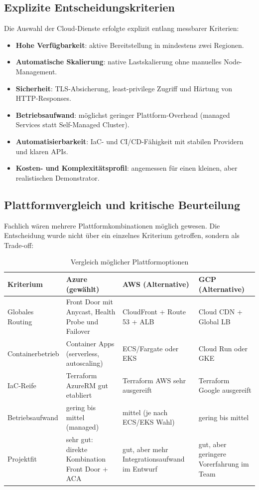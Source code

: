 \documentclass[a4paper,11pt]{article}
\begin{document}
\subsection{Explizite Entscheidungskriterien}
Die Auswahl der Cloud-Dienste erfolgte explizit entlang messbarer Kriterien:

\begin{itemize}
  \item \textbf{Hohe Verfügbarkeit}: aktive Bereitstellung in mindestens zwei Regionen.
  \item \textbf{Automatische Skalierung}: native Lastskalierung ohne manuelles Node-Management.
  \item \textbf{Sicherheit}: TLS-Absicherung, least-privilege Zugriff und Härtung von HTTP-Responses.
  \item \textbf{Betriebsaufwand}: möglichst geringer Plattform-Overhead (managed Services statt Self-Managed Cluster).
  \item \textbf{Automatisierbarkeit}: IaC- und CI/CD-Fähigkeit mit stabilen Providern und klaren APIs.
  \item \textbf{Kosten- und Komplexitätsprofil}: angemessen für einen kleinen, aber realistischen Demonstrator.
\end{itemize}

\subsection{Plattformvergleich und kritische Beurteilung}
Fachlich wären mehrere Plattformkombinationen möglich gewesen. Die Entscheidung wurde nicht über ein einzelnes Kriterium getroffen, sondern als Trade-off:

\begin{table}[H]
\centering
\caption{Vergleich möglicher Plattformoptionen}
\begin{tabular}{p{}p{}p{}p{}}
\toprule
\textbf{Kriterium} & \textbf{Azure (gewählt)} & \textbf{AWS (Alternative)} & \textbf{GCP (Alternative)} \\
\midrule
Globales Routing & Front Door mit Anycast, Health Probe und Failover & CloudFront + Route 53 + ALB & Cloud CDN + Global LB \\
Containerbetrieb & Container Apps (serverless, autoscaling) & ECS/Fargate oder EKS & Cloud Run oder GKE \\
IaC-Reife & Terraform AzureRM gut etabliert & Terraform AWS sehr ausgereift & Terraform Google ausgereift \\
Betriebsaufwand & gering bis mittel (managed) & mittel (je nach ECS/EKS Wahl) & gering bis mittel \\
Projektfit & sehr gut: direkte Kombination Front Door + ACA & gut, aber mehr Integrationsaufwand im Entwurf & gut, aber geringere Vorerfahrung im Team \\
\bottomrule
\end{tabular}
\end{table}
\end{document}
